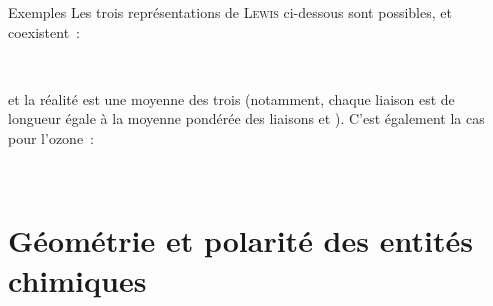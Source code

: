 \documentclass[../main/main.tex]{subfiles}
\begin{document}
\begin{rexem}{Exemples}
    Les trois représentations de \textsc{Lewis} ci-dessous sont possibles, et
    coexistent~:
    \begin{center}
        \hfill
        \hfill
        \hfill
        \hfill~
    \end{center}
    et la réalité est une moyenne des trois (notamment, chaque liaison est de
    longueur égale à la moyenne pondérée des liaisons  et ).
    C'est également la cas pour l'ozone~:
    \begin{center}
        \hfill
        \hfill
        \hfill~
    \end{center}
\end{rexem}

\section{Géométrie et polarité des entités chimiques}
\end{document}
